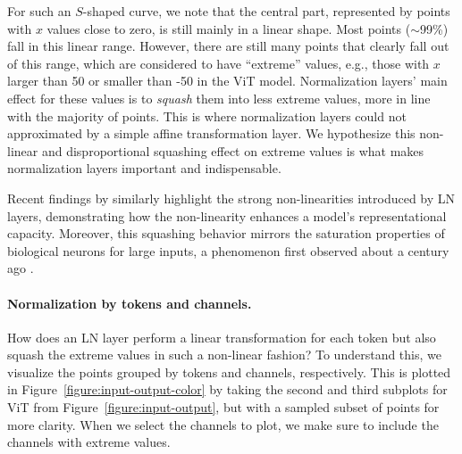 \vskip 0.2cm
For such an $S$-shaped curve, we note that the central part, represented by points with $x$ values close to zero, is still mainly in a linear shape. Most points ($\sim$99\%) fall in this linear range. 
However, there are still many points that clearly fall out of this range, which are considered to have ``extreme'' values, e.g., those with $x$ larger than 50 or smaller than -50 in the ViT model. Normalization layers' main effect for these values is to \emph{squash} them into less extreme values, more in line with the majority of points. This is where normalization layers could not approximated by a simple affine transformation layer. We hypothesize this non-linear and disproportional squashing effect on extreme values is what makes normalization layers important and indispensable. 

\vskip 0.2cm
Recent findings by \citet{ni2024nonlinearity} similarly highlight the strong non-linearities introduced by LN layers, demonstrating how the non-linearity enhances a model’s representational capacity. Moreover, this squashing behavior mirrors the saturation properties of biological neurons for large inputs, a phenomenon first observed about a century ago \citep{adrian1926impulses, adrian1926impulses2, adrian1926impulses3}.

\vskip 0.2cm
\paragraph{Normalization by tokens and channels.} How does an LN layer perform a linear transformation for each token but also squash the extreme values in such a non-linear fashion?
To understand this, we visualize the points grouped by tokens and channels, respectively. This is plotted in Figure~\ref{figure:input-output-color} by taking the second and third subplots for ViT from Figure~\ref{figure:input-output}, but with a sampled subset of points for more clarity. When we select the channels to plot, we make sure to include the channels with extreme values. 


